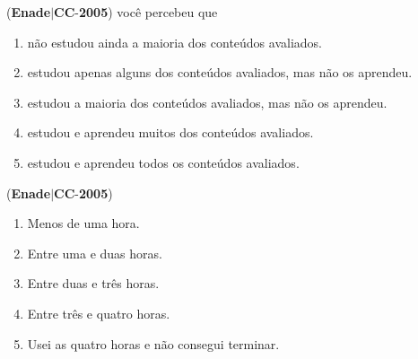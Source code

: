 \documentclass{exam}
\begin{document}
\begin{questions}
\begin{enumerate}[label=\alph*)]
	\end{enumerate}

\question (\textbf{Enade}$|$\textbf{CC}-\textbf{2005}) você percebeu que
	\begin{enumerate}[label=\alph*)]
		\item  não estudou ainda a maioria dos conteúdos avaliados.
		\item  estudou apenas alguns dos conteúdos avaliados, mas não
os aprendeu.
		\item  estudou a maioria dos conteúdos avaliados, mas não os
aprendeu.
		\item  estudou e aprendeu muitos dos conteúdos avaliados.
		\item  estudou e aprendeu todos os conteúdos avaliados.

	\end{enumerate}

\question (\textbf{Enade}$|$\textbf{CC}-\textbf{2005}) 	\begin{enumerate}[label=\alph*)]
		\item  Menos de uma hora.
		\item  Entre uma e duas horas.
		\item  Entre duas e três horas.
		\item  Entre três e quatro horas.
		\item  Usei as quatro horas e não consegui terminar.

	\end{enumerate}

\end{questions}
\end{document}
